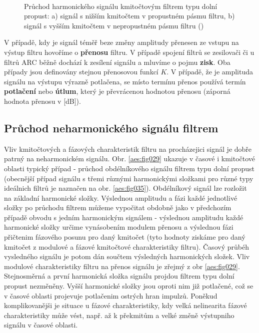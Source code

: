       \begin{figure}[ht!]
        \centering  
           \\
        \caption{Průchod harmonického signálu kmitočtovým filtrem typu dolní propust: a) signál s
                nižším kmitočtem v propustném pásmu filtru, b) signál s vyšším kmitočtem v
                nepropustném pásmu filtru (\cite[s.~28]{HajekSedlacek2002})}
        \label{aes:fig028}
      \end{figure}

      \begin{tcnote}  
        V případě, kdy je signál téměř beze změny amplitudy přenesen ze vstupu na výstup filtru
        hovoříme o \textbf{přenosu} filtru. V případě spojení filtrů se zesilovači či u filtrů ARC
        běžně dochází k zesílení signálu a mluvíme o pojmu \textbf{zisk}. Oba případy jsou
        definovány stejnou přenosovou funkcí \(K\). V případě, že je amplituda signálu na výstupu
        výrazně potlačena, se místo termínu přenos používá termín \textbf{potlačení} nebo
        \textbf{útlum}, který je převrácenou hodnotou přenosu (záporná hodnota přenosu v [dB]).
      \end{tcnote}
      
    \subsection{Průchod neharmonického signálu filtrem}
      Vliv kmitočtových a fázových charakteristik filtru na procházejici signál je dobře patrný na
      neharmonickém signálu. Obr. \ref{aes:fig029}  ukazuje v časové i kmitočtové oblasti typický
      případ - průchod obdélníkového signálu filtrem typu dolní propust (obecnější případ signálu s
      třemi různými harmonickými složkami pro různé typy ideálnich filtrů je naznačen na obr.
      \ref{aes:fig035}). Obdélníkový signál lze rozložit na základní harmonické složky. Výslednou
      amplitudu a fázi každé jednotlivé složky po průchodu filtrem můžeme vypočitat obdobně jako v
      předchozím případě obvodu s jedním harmonickým signálem - výslednou amplitudu každé harmonické
      složky určime vynásobením modulem přenosu a výslednou fázi přičtenim fázového posunu pro daný
      kmitočet (tyto hodnoty ziskáme pro daný kmitočet z modulové a fázové kmitočtové
      charakteristiky filtru). Časový průbéh vysledného signálu je potom dán součtem výsledných
      harmonických složek. Vliv modulové charakteristiky filtru na přenos signálu je zřejmý z obr
      \ref{aes:fig029}. Stejnosměrná a první harmonická složka signálu projdou filtrem typu dolní
      propust nezměněny. Vyšší harmonické složky jsou oproti nim již potlačené, což se v časové
      oblasti projevuje potlačenim ostrých hran impulzů. Poněkud komplikovanějši je situace u fázové
      charakteristiky, kdy velká nelinearita fázové charakteristiky může vést, např. až k překmitům
      a velké změně výstupniho signálu v časové oblasti. 

